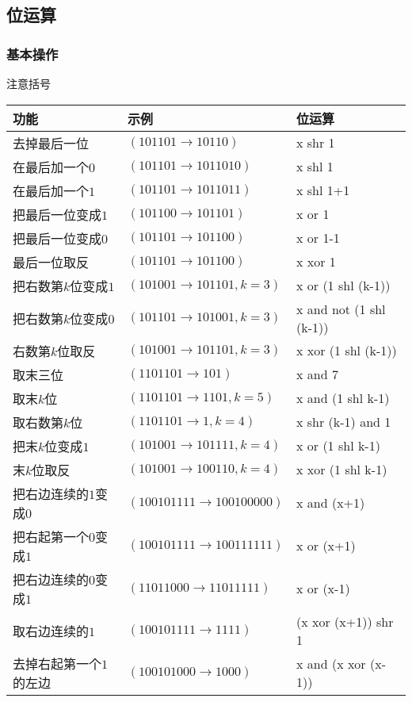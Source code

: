 \subsection{位运算}
	\subsubsection{基本操作}
	注意括号\\
		\begin{table}[htbp]
		\centering
		\begin{tabular}{l|l|l}
		\toprule
		功能 & 示例 & 位运算\\
		\midrule
		去掉最后一位		  & $(101101\rightarrow 10110)$		   & x shr 1\\
		在最后加一个$0$		 & $(101101\rightarrow1011010)$		 & x shl 1\\
		在最后加一个$1$		 & $(101101\rightarrow1011011)$		 & x shl 1+1\\
		把最后一位变成$1$	   & $(101100\rightarrow101101)$		  & x or 1\\
		把最后一位变成$0$	   & $(101101\rightarrow101100)$		  & x or 1-1\\
		最后一位取反		  & $(101101\rightarrow101100)$		  & x xor 1\\
		把右数第$k$位变成$1$	  & $(101001\rightarrow101101,k=3)$	  & x or (1 shl (k-1))\\
		把右数第$k$位变成$0$	  & $(101101\rightarrow101001,k=3)$	  & x and not (1 shl (k-1))\\
		右数第$k$位取反		 & $(101001\rightarrow101101,k=3)$	  & x xor (1 shl (k-1))\\
		取末三位			  & $(1101101\rightarrow101)$			& x and 7\\
		取末$k$位			   & $(1101101\rightarrow1101,k=5)$	   & x and (1 shl k-1)\\
		取右数第$k$位		   & $(1101101\rightarrow1,k=4)$		  & x shr (k-1) and 1\\
		把末$k$位变成$1$		  & $(101001\rightarrow101111,k=4)$	  & x or (1 shl k-1)\\
		末$k$位取反			 & $(101001\rightarrow100110,k=4)$	  & x xor (1 shl k-1)\\
		把右边连续的$1$变成$0$	& $(100101111\rightarrow100100000)$	& x and (x+1)\\
		把右起第一个$0$变成$1$	& $(100101111\rightarrow100111111)$	& x or (x+1)\\
		把右边连续的$0$变成$1$	& $(11011000\rightarrow11011111)$	  & x or (x-1)\\
		取右边连续的$1$		 & $(100101111\rightarrow1111)$		 & (x xor (x+1)) shr 1\\
		去掉右起第一个$1$的左边 & $(100101000\rightarrow1000)$		 & x and (x xor (x-1))\\
		\bottomrule
		\end{tabular}
	\end{table}
	
